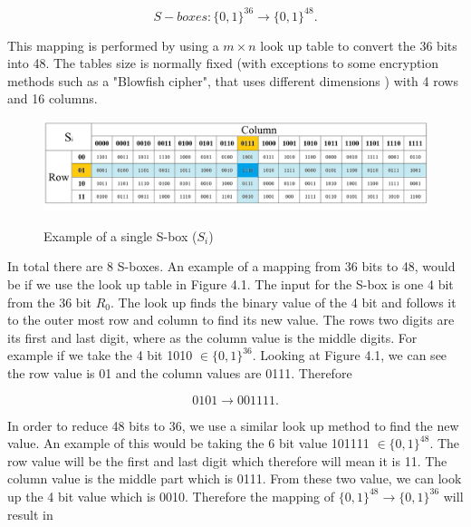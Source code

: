 \documentclass[11pt,a4paper, notitlepage]{report}
\begin{document}
\begin{displaymath}
S-boxes: \{0, 1\}^{36} \rightarrow \{0, 1\}^{48}.
\end{displaymath} 

This mapping is performed by using a $m \times n$ look up table to convert the 36 bits into 48. The tables size is normally fixed (with exceptions to some encryption methods such as a "Blowfish cipher", that uses different dimensions \cite{SchneierBlowfish1993}) with 4 rows and 16 columns. 

\newpage
\begin{landscape}
\begin{figure}[H]
\begin{center}
\label{Fig:S-boxes}
\includegraphics[scale = 0.6]{S-boxes.png}
\caption{Example of a single S-box ($S_{i}$)}
\end{center}
\end{figure}
\end{landscape}

\newpage

In total there are 8 S-boxes. An example of a mapping from 36 bits to 48, would be if we use the look up table in Figure 4.1. The input for the S-box is one 4 bit from the 36 bit $R_{0}$. The look up finds the binary value of the 4 bit and follows it to the outer most row and column to find its new value. The rows two digits are its first and last digit, where as the column value is the middle digits. For example if we take the 4 bit 1010 $\in \{0,1 \}^{36}$. Looking at Figure 4.1, we can see the row value is 01 and the column values are 0111. Therefore 

\begin{displaymath}
0101 \rightarrow 001111.
\end{displaymath}

In order to reduce 48 bits to 36, we use a similar look up method to find the new value. An example of this would be taking the 6 bit value 101111 $\in \{0,1 \}^{48}$. The row value will be the first and last digit which therefore will mean it is 11. The column value is the middle part which is 0111. From these two value, we can look up the 4 bit value which is 0010. Therefore the mapping of $\{0, 1\}^{48} \rightarrow \{0, 1\}^{36}$ will result in
\end{document}
